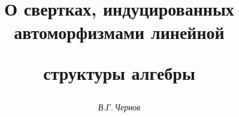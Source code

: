 

  


%


  


\newcommand{\HOK}{\operatorname{HOK}}  


\newcommand{\tts}[1]{}  


\renewcommand{\baselinestretch}{0.96}


  




  


\setcounter{page}{76}  












  


\author{\it В.Г.\,Чернов}  




\title{О свертках, индуцированных автоморфизмами линейной 


структуры алгебры} 


  


\date{}  




\pagestyle{plain} %


  




\maketitle  


